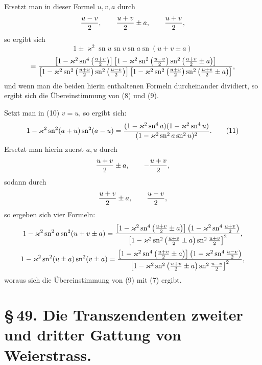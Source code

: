 \documentclass[11pt]{article}
\providecommand{\sn}{\operatorname{sn}}
\begin{document}
Ersetzt man in dieser Formel $u,v,a$ durch
\[
{u-v\over2},
\qquad {u+v\over2}\pm a,
\qquad {u+v\over2},
\]
so ergibt sich
\[
1\pm\varkappa^2\sn u\sn v\sn a\sn(u+v\pm a)
\]
\[
={\left[1-\varkappa^2\sn^4\left({u+v\over2}\right)\right]
\left[1-\varkappa^2\sn^2\left({u-v\over2}\right)
\sn^2\left({u+v\over2}\pm a\right)\right]
\over
\left[1-\varkappa^2\sn^2\left({u+v\over2}\right)
\sn^2\left({u-v\over2}\right)\right]
\left[1-\varkappa^2\sn^2\left({u+v\over2}\right)
\sn^2\left({u+v\over2}\pm a\right)\right]},
\]
und wenn man die beiden hierin enthaltenen Formeln durcheinander dividiert, so ergibt sich die Übereinstimmung von (8) und (9).

Setzt man in (10) $v=u$, so ergibt sich:
\begin{equation}
1-\varkappa^2\sn^2(a+u)\sn^2(a-u)
={(1-\varkappa^2\sn^4a)(1-\varkappa^2\sn^4u)
\over(1-\varkappa^2\sn^2a\sn^2u)^2}.
\tag{11}
\end{equation}
Ersetzt man hierin zuerst $a,u$ durch
\[
{u+v\over2}\pm a,
\qquad -{u+v\over2},
\]
sodann durch
\[
{u+v\over2}\pm a,
\qquad {u-v\over2},
\]
so ergeben sich vier Formeln:
\[
1-\varkappa^2\sn^2a\sn^2(u+v\pm a)
={\left[1-\varkappa^2\sn^4\left({u+v\over2}\pm a\right)\right]
\left(1-\varkappa^2\sn^4{u+v\over2}\right)
\over
\left[1-\varkappa^2\sn^2\left({u+v\over2}\pm a\right)\sn^2{u+v\over2}\right]^2},
\]
\[
1-\varkappa^2\sn^2(u\pm a)\sn^2(v\pm a)
={\left[1-\varkappa^2\sn^4\left({u+v\over2}\pm a\right)\right]
\left(1-\varkappa^2\sn^4{u-v\over2}\right)
\over
\left[1-\varkappa^2\sn^2\left({u+v\over2}\pm a\right)\sn^2{u-v\over2}\right]^2},
\]
woraus sich die Übereinstimmung von (9) mit (7) ergibt.

\section*{\S\,49. Die Transzendenten zweiter und dritter Gattung von Weierstrass.}
\end{document}
